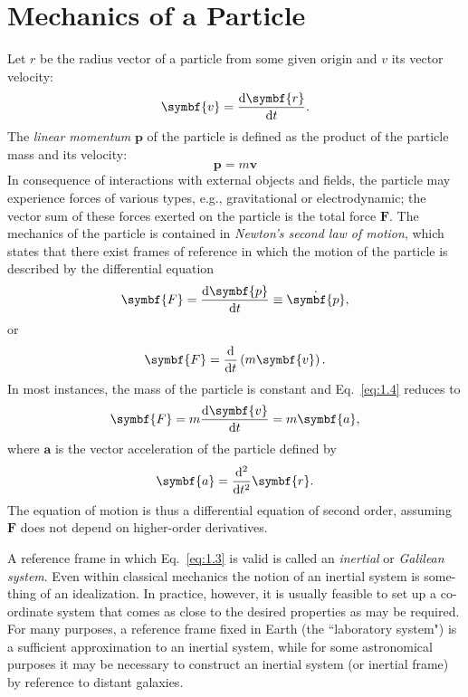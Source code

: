 \section{Mechanics of a Particle}

Let \(r\) be the radius vector of a particle from some given origin and \(v\) its vector velocity:
\begin{equation}
    \symbf{v}=\odv{\symbf{r}}{t}.
\end{equation}
The \emph{linear momentum} \(\symbf{p}\) of the particle is defined as the product of the particle mass and its velocity:
\begin{equation}
    \symbf{p}=m\symbf{v}
\end{equation}
In consequence of interactions with external objects and fields, the particle may experience forces of various types, e.g., gravitational or electrodynamic; the vector sum of these forces exerted on the particle is the total force \(\symbf{F}\). The mechanics of the particle is contained in \emph{Newton's second law of motion}, which states that there exist frames of reference in which the motion of the particle is described by the differential equation
\begin{equation}
    \symbf{F}=\odv{\symbf{p}}{t}\equiv\dot{\symbf{p}},\label{eq:1.3}
\end{equation}
or
\begin{equation}
    \symbf{F}=\odv*{\left(m\symbf{v}\right)}{t}.\label{eq:1.4}
\end{equation}
In most instances, the mass of the particle is constant and Eq.~\eqref{eq:1.4} reduces to
\begin{equation}
    \symbf{F}=m\odv{\symbf{v}}{t}=m\symbf{a},
\end{equation}
where \(\symbf{a}\) is the vector acceleration of the particle defined by
\begin{equation}
    \symbf{a}=\odv*[2]{\symbf{r}}{t}.
\end{equation}
The equation of motion is thus a differential equation of second order, assuming \(\symbf{F}\) does not depend on higher-order derivatives.

A reference frame in which Eq.~\eqref{eq:1.3} is valid is called an \emph{inertial} or \emph{Galilean system}. Even within classical mechanics the notion of an inertial system is some- thing of an idealization. In practice, however, it is usually feasible to set up a co- ordinate system that comes as close to the desired properties as may be required. For many purposes, a reference frame fixed in Earth (the ``laboratory system") is a sufficient approximation to an inertial system, while for some astronomical purposes it may be necessary to construct an inertial system (or inertial frame) by reference to distant galaxies.

